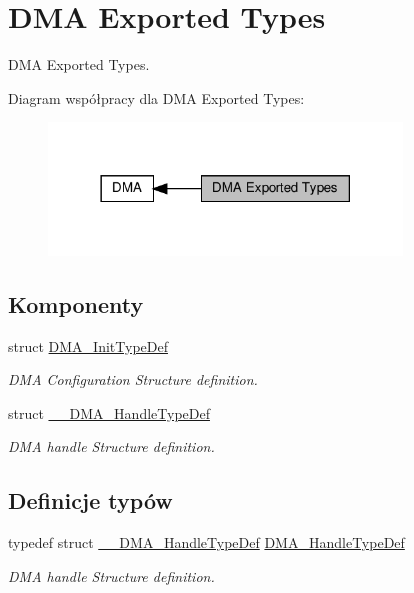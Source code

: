 \hypertarget{group___d_m_a___exported___types}{}\section{D\+MA Exported Types}
\label{group___d_m_a___exported___types}


D\+MA Exported Types.  


Diagram współpracy dla D\+MA Exported Types\+:\nopagebreak
\begin{figure}[H]
\begin{center}
\leavevmode
\includegraphics[width=266pt]{group___d_m_a___exported___types}
\end{center}
\end{figure}
\subsection*{Komponenty}
\begin{DoxyCompactItemize}
\item 
struct \hyperlink{struct_d_m_a___init_type_def}{D\+M\+A\+\_\+\+Init\+Type\+Def}
\begin{DoxyCompactList}\small\item\em D\+MA Configuration Structure definition. \end{DoxyCompactList}\item 
struct \hyperlink{struct_____d_m_a___handle_type_def}{\+\_\+\+\_\+\+D\+M\+A\+\_\+\+Handle\+Type\+Def}
\begin{DoxyCompactList}\small\item\em D\+MA handle Structure definition. \end{DoxyCompactList}\end{DoxyCompactItemize}
\subsection*{Definicje typów}
\begin{DoxyCompactItemize}
\item 
typedef struct \hyperlink{struct_____d_m_a___handle_type_def}{\+\_\+\+\_\+\+D\+M\+A\+\_\+\+Handle\+Type\+Def} \hyperlink{group___d_m_a___exported___types_ga41b754a906b86bce54dc79938970138b}{D\+M\+A\+\_\+\+Handle\+Type\+Def}
\begin{DoxyCompactList}\small\item\em D\+MA handle Structure definition. \end{DoxyCompactList}\end{DoxyCompactItemize}
